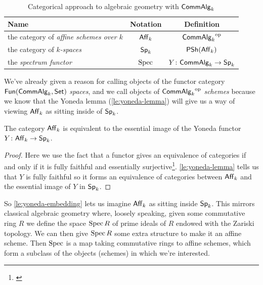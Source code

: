         \bigskip
        \begin{table}[h!]
            \centering
            \begin{tabular}{lcc}
                Name & Notation & Definition\\
                \toprule
                the category of \emph{affine schemes over $k$} & $\mathsf{Aff}_{k}$ & ${\mathsf{CommAlg}_k}^{\mathrm{op}}$\\
                the category of \emph{$k$-spaces} & $\mathsf{Sp}_{k}$ & $\mathsf{PSh}(\mathsf{Aff}_{k})$\\
                the \emph{spectrum functor} & $\operatorname{Spec}$ & $Y\colon\mathsf{CommAlg}_k\to\mathsf{Sp}_{k}$
            \end{tabular}
            \caption{Categorical approach to algebraic geometry with $\mathsf{CommAlg}_k$}
            \label{tb:comm-k-definitions}
        \end{table}
        \bigskip

        We've already given a reason for calling objects of the functor category $\mathsf{Fun}(\mathsf{CommAlg}_k,\mathsf{Set})$ \emph{spaces}, and we call objects of ${\mathsf{CommAlg}_k}^{\mathrm{op}}$ \emph{schemes} because we know that the Yoneda lemma (\cref{le:yoneda-lemma}) will give us a way of viewing $\mathsf{Aff}_{k}$ as sitting inside of $\mathsf{Sp}_{k}$.

        \begin{lemma}\label{le:yoneda-embedding}
            The category $\mathsf{Aff}_{k}$ is equivalent to the essential image of the Yoneda functor $Y\colon\mathsf{Aff}_{k}\to\mathsf{Sp}_{k}$.
        \end{lemma}

        \begin{proof}
            Here we use the fact that a functor gives an equivalence of categories if and only if it is fully faithful and essentially surjective\footnote{
                \cite[Theorem~1, \S IV.4]{Lane:1998fe}
            }.
            \cref{le:yoneda-lemma} tells us that $Y$ is fully faithful so it forms an equivalence of categories between $\mathsf{Aff}_{k}$ and the essential image of $Y$ in $\mathsf{Sp}_{k}$.
        \end{proof}

        So \cref{le:yoneda-embedding} lets us imagine $\mathsf{Aff}_{k}$ as sitting inside $\mathsf{Sp}_{k}$.
        This mirrors classical algebraic geometry where, loosely speaking, given some commutative ring $R$ we define the space $\operatorname{Spec} R$ of prime ideals of $R$ endowed with the Zariski topology.
        We can then give $\operatorname{Spec} R$ some extra structure to make it an affine scheme.
        Then $\operatorname{Spec}$ is a map taking commutative rings to affine schemes, which form a subclass of the objects (schemes) in which we're interested.

